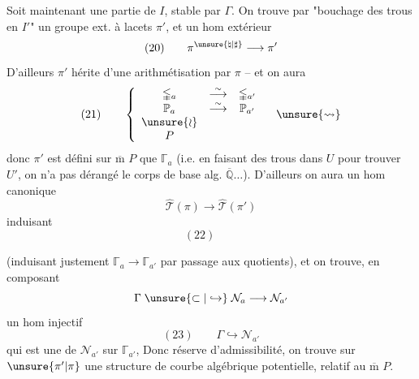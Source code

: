 Soit maintenant
une
partie de $I$, stable par $\Gamma$. On trouve
par "bouchage des trous en $I'$" un
groupe ext. à lacets $\pi'$,  et un
hom extérieur
\[
(20)\qquad \pi^{\unsure{\natural|\sharp}}\longrightarrow\pi'
\]
D'ailleurs $\pi'$ hérite d'une arithmétisation 
par $\pi$ -- et on aura
\[
(21)\qquad
\left\{
\begin{array}{ccc}
\mathbb{\Gamma}_a & \overset{\sim}{\longrightarrow} & \mathbb{\Gamma}_{a'} \\
\mathbb P_a & \overset{\sim}{\longrightarrow} & \mathbb P_{a'} \\
\unsure{\wr} & & \\
P & &
\end{array}
\right.
\quad\unsure{\leadsto}
\]
donc $\pi'$ est défini sur  $\overline{\mathrm m}$ $P$ que
$\mathbb{\Gamma}_a$
(i.e. en faisant des trous dans $U$ pour
trouver $U'$, on n'a pas dérangé le
corps de base alg.  $\overline{\mathbb Q}\ldots$). D'ailleurs
on aura un hom canonique
\[
\widehat{\mathcal T}(\pi)\longrightarrow
\widehat{\mathcal T}(\pi')
\]
induisant
\[
(22)\qquad
\]



(induisant justement $\mathbb{\Gamma}_a\longrightarrow\mathbb{\Gamma}_{a'}$ par passage
aux quotients), et on trouve, en
composant
\[
\Gamma\;\unsure{\subset|\hookrightarrow}\;\mathcal N_a\longrightarrow\mathcal N_{a'}
\]
un hom  injectif
\[
(23)\qquad\Gamma\hookrightarrow\mathcal N_{a'}
\]
qui est une  de $\mathcal N_{a'}$ sur $\mathbb{\Gamma}_{a'}$,
Donc  réserve d'admissibilité,
on trouve sur  $\unsure{\pi'|\pi}$ une structure
de courbe algébrique potentielle, relatif
au $\overline{\mathrm m}$ $P$.

